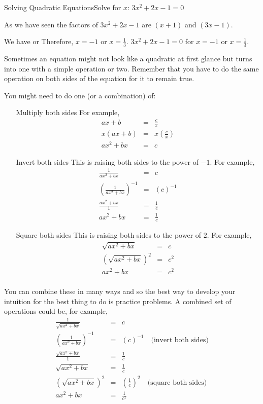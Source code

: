 \documentclass[10pt,a4paper,titlepage,twoside,openright]{report}
\begin{document}
\begin{wex}{Solving Quadratic Equations}{Solve for $x$: $3x^2+2x-1=0$}{
As we have seen the factors of $3x^2+2x-1$ are $(x+1)$ and $(3x-1)$.


We have 
or 
Therefore, $x=-1$ or $x=\frac{1}{3}$.
$3x^2+2x-1=0$ for $x=-1$ or $x=\frac{1}{3}$.}
\end{wex}

Sometimes an equation might not look like a quadratic at first glance but
turns into one with a simple operation or two. Remember that you have to do the same operation on both sides of the equation for it to remain true.

You might need to do one (or a combination) of:
\begin{itemize}
\item[Multiply both sides]
For example,
\begin{eqnarray*}
ax+b&=&\frac{c}{x}\\
x(ax+b)&=&x(\frac{c}{x})\\
ax^2+bx&=&c
\end{eqnarray*}
\item[Invert both sides] This is raising both sides to the power of $-1$. For example,
\begin{eqnarray*}
\frac{1}{ax^2+bx}&=&c\\
(\frac{1}{ax^2+bx})^{-1}&=&(c)^{-1}\\
\frac{ax^2+bx}{1}&=&\frac{1}{c}\\
ax^2+bx&=&\frac{1}{c}
\end{eqnarray*}
\item[Square both sides] This is raising both sides to the power of $2$.
For example,
\begin{eqnarray*}
\sqrt{ax^2+bx}&=&c \\
(\sqrt{ax^2+bx})^2&=&c^2 \\
ax^2+bx&=&c^2 \\
\end{eqnarray*}
\end{itemize}

You can combine these in many ways and so the best way to develop your intuition for the best thing to do is practice problems. A combined set of operations could be, for example,
\begin{eqnarray*}
\frac{1}{\sqrt{ax^2+bx}}&=&c\\
(\frac{1}{ax^2+bx})^{-1}&=&(c)^{-1}\quad\mbox{(invert both sides)}\\
\frac{\sqrt{ax^2+bx}}{1}&=&\frac{1}{c}\\
\sqrt{ax^2+bx}&=&\frac{1}{c}\\
(\sqrt{ax^2+bx})^2&=&(\frac{1}{c})^2\quad\mbox{(square both sides)}\\
ax^2+bx&=&\frac{1}{c^2}\\
\end{eqnarray*}
\end{document}
